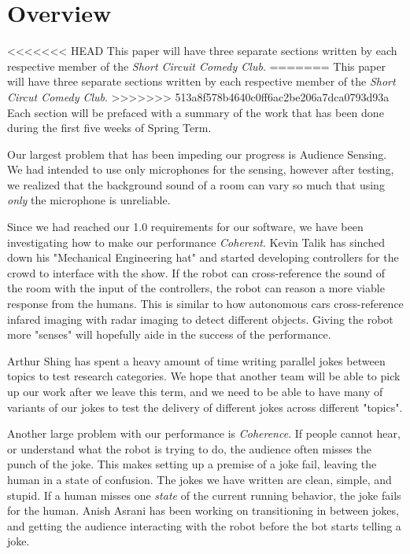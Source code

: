 \documentclass[onecolumn, draftclsnofoot,10pt, compsoc]{IEEEtran}
\begin{document}
\section{Overview}
<<<<<<< HEAD
	This paper will have three separate sections written by each respective member of the \textit{Short Circuit Comedy Club}.
=======
	This paper will have three separate sections written by each respective member of the \textit{Short Circut Comedy Club}. 
>>>>>>> 513a8f578b4640c0ff6ac2be206a7dca0793d93a
Each section will be prefaced with a summary of the work that has been done during the first five weeks of Spring Term.


Our largest problem that has been impeding our progress is Audience Sensing.
We had intended to use only microphones for the sensing, however after testing, we realized that the background sound of a room can vary so much that using \textit{only} the microphone is unreliable.

Since we had reached our 1.0 requirements for our software, we have been investigating how to make our performance \textit{Coherent}. Kevin Talik has sinched down his "Mechanical Engineering hat" and started developing controllers for the crowd to interface with the show. If the robot can cross-reference the sound of the room with the input of the controllers, the robot can reason a more viable response from the humans. This is similar to how autonomous cars cross-reference infared imaging with radar imaging to detect different objects. Giving the robot more "senses" will hopefully aide in the success of the performance.

Arthur Shing has spent a heavy amount of time writing parallel jokes between topics to test research categories. We hope that another team will be able to pick up our work after we leave this term, and we need to be able to have many of variants of our jokes to test the delivery of different jokes across different "topics".

Another large problem with our performance is \textit{Coherence}. If people cannot hear, or understand what the robot is trying to do, the audience often misses the punch of the joke.
This makes setting up a premise of a joke fail, leaving the human in a state of confusion. The jokes we have written are clean, simple, and stupid. If a human misses one \textit{state} of the current running behavior, the joke fails for the human.
Anish Asrani has been working on transitioning in between jokes, and getting the audience interacting with the robot before the bot starts telling a joke.
\end{document}
